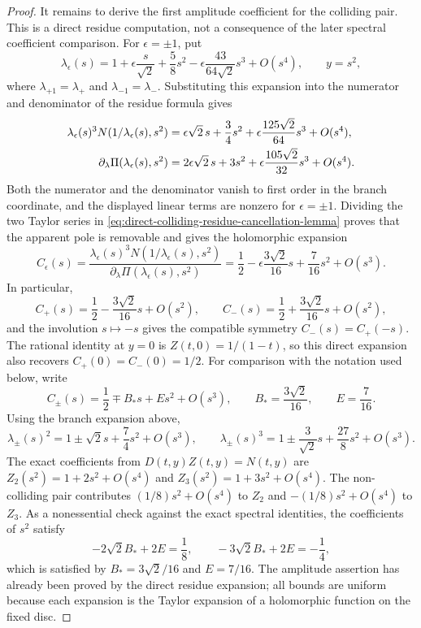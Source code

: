 \begin{proof}
It remains to derive the first amplitude coefficient for the colliding pair.
This is a direct residue computation, not a consequence of the later spectral coefficient comparison.
For \(\epsilon=\pm1\), put
\[
\lambda_\epsilon(s)=1+\epsilon\frac{s}{\sqrt2}+\frac58s^2-
\epsilon\frac{43}{64\sqrt2}s^3+O(s^4),
\qquad y=s^2,
\]
where \(\lambda_{+1}=\lambda_+\) and \(\lambda_{-1}=\lambda_-\).
Substituting this expansion into the numerator and denominator of the residue formula gives
\begin{align}
\lambda_\epsilon(s)^3 N(1/\lambda_\epsilon(s),s^2)
&=
\epsilon\sqrt2\,s+\frac34s^2+
\epsilon\frac{125\sqrt2}{64}s^3+O(s^4),\notag\\
\partial_\lambda\Pi(\lambda_\epsilon(s),s^2)
&=
2\epsilon\sqrt2\,s+3s^2+
\epsilon\frac{105\sqrt2}{32}s^3+O(s^4).
\label{eq:direct-colliding-residue-cancellation-lemma}
\end{align}
Both the numerator and the denominator vanish to first order in the branch coordinate, and the displayed linear terms are nonzero for \(\epsilon=\pm1\).
Dividing the two Taylor series in \eqref{eq:direct-colliding-residue-cancellation-lemma} proves that the apparent pole is removable and gives the holomorphic expansion
\begin{equation}\label{eq:direct-colliding-residue-expansion}
C_\epsilon(s)
=
\frac{\lambda_\epsilon(s)^3N(1/\lambda_\epsilon(s),s^2)}
{\partial_\lambda\Pi(\lambda_\epsilon(s),s^2)}
=
\frac12-
\epsilon\frac{3\sqrt2}{16}s+\frac{7}{16}s^2+O(s^3).
\end{equation}
In particular,
\[
C_+(s)=\frac12-\frac{3\sqrt2}{16}s+O(s^2),
\qquad
C_-(s)=\frac12+\frac{3\sqrt2}{16}s+O(s^2),
\]
and the involution \(s\mapsto -s\) gives the compatible symmetry \(C_-(s)=C_+(-s)\).
The rational identity at \(y=0\) is \(Z(t,0)=1/(1-t)\), so this direct expansion also recovers \(C_+(0)=C_-(0)=1/2\).
For comparison with the notation used below, write
\[
C_\pm(s)=\frac12\mp B_*s+E s^2+O(s^3),
\qquad
B_*=\frac{3\sqrt2}{16},
\qquad
E=\frac{7}{16}.
\]
Using the branch expansion above,
\[
\lambda_\pm(s)^2=1\pm\sqrt2 s+\frac74s^2+O(s^3),
\qquad
\lambda_\pm(s)^3=1\pm\frac{3}{\sqrt2}s+\frac{27}{8}s^2+O(s^3).
\]
The exact coefficients from \(D(t,y)Z(t,y)=N(t,y)\) are \(Z_2(s^2)=1+2s^2+O(s^4)\) and \(Z_3(s^2)=1+3s^2+O(s^4)\).
The non-colliding pair contributes \((1/8)s^2+O(s^4)\) to \(Z_2\) and \(-(1/8)s^2+O(s^4)\) to \(Z_3\).
As a nonessential check against the exact spectral identities, the coefficients of \(s^2\) satisfy
\[
-2\sqrt2 B_*+2E=\frac18,
\qquad
-3\sqrt2 B_*+2E=-\frac14,
\]
which is satisfied by \(B_*=3\sqrt2/16\) and \(E=7/16\).
The amplitude assertion has already been proved by the direct residue expansion; all bounds are uniform because each expansion is the Taylor expansion of a holomorphic function on the fixed disc.
\end{proof}

